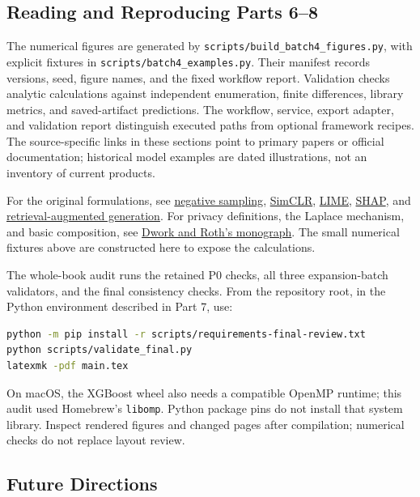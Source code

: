 \documentclass[11pt,twoside]{article}
\numberwithin{equation}{section}
\theoremstyle{plain}
\theoremstyle{definition}
\theoremstyle{remark}
\begin{document}
\subsection{Reading and Reproducing Parts 6--8}
The numerical figures are generated by
\texttt{scripts/build\_batch4\_figures.py}, with explicit fixtures in
\texttt{scripts/batch4\_examples.py}. Their manifest records versions, seed,
figure names, and the fixed workflow report. Validation checks analytic
calculations against independent enumeration, finite differences, library
metrics, and saved-artifact predictions. The workflow, service, export adapter,
and validation report distinguish executed paths from optional framework
recipes. The source-specific links in these sections point to primary papers
or official documentation; historical model examples are dated illustrations,
not an inventory of current products.

For the original formulations, see
\href{https://arxiv.org/abs/1310.4546}{negative sampling},
\href{https://arxiv.org/abs/2002.05709}{SimCLR},
\href{https://arxiv.org/abs/1602.04938}{LIME},
\href{https://arxiv.org/abs/1705.07874}{SHAP}, and
\href{https://arxiv.org/abs/2005.11401}{retrieval-augmented generation}.
For privacy definitions, the Laplace mechanism, and basic composition, see
\href{https://www.cis.upenn.edu/~aaroth/Papers/privacybook.pdf}{Dwork and Roth's monograph}.
The small numerical fixtures above are constructed here to expose the calculations.

The whole-book audit runs the retained P0 checks, all three expansion-batch
validators, and the final consistency checks. From the repository root, in
the Python environment described in Part 7, use:
\begin{lstlisting}[language=bash,basicstyle=\ttfamily\footnotesize]
python -m pip install -r scripts/requirements-final-review.txt
python scripts/validate_final.py
latexmk -pdf main.tex
\end{lstlisting}
On macOS, the XGBoost wheel also needs a compatible OpenMP runtime; this audit
used Homebrew's \texttt{libomp}. Python package pins do not install that system
library. Inspect rendered figures and changed pages after compilation;
numerical checks do not replace layout review.

\subsection{Future Directions}
\end{document}
